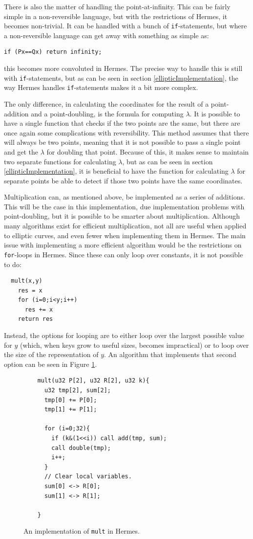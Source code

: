 There is also the matter of handling the point-at-infinity. This can be fairly simple in a non-reversible language, but with the restrictions of Hermes, it becomes non-trivial. It can be handled with a bunch of \texttt{if}-statements, but where a non-reversible language can get away with something as simple as:
\begin{verbatim}
if (Px==Qx) return infinity;
\end{verbatim}
this becomes more convoluted in Hermes. The precise way to handle this is still with \texttt{if}-statements, but as can be seen in section \ref{ellipticImplementation}, the way Hermes handles \texttt{if}-statements makes it a bit more complex. 

The only difference, in calculating the coordinates for the result of a point-addition and a point-doubling, is the formula for computing $\lambda$. It is possible to have a single function that checks if the two points are the same, but there are once again some complications with reversibility. This method assumes that there will always be two points, meaning that it is not possible to pass a single point and get the $\lambda$ for doubling that point. Because of this, it makes sense to maintain two separate functions for calculating $\lambda$, but as can be seen in section \ref{ellipticImplementation}, it is beneficial to have the function for calculating $\lambda$ for separate points be able to detect if those two points have the same coordinates.

Multiplication can, as mentioned above, be implemented as a series of additions. This will be the case in this implementation, due implementation problems with point-doubling, but it is possible to be smarter about multiplication. Although many algorithms exist for efficient multiplication, not all are useful when applied to elliptic curves, and even fewer when implementing them in Hermes. The main issue with implementing a more efficient algorithm would be the restrictions on \texttt{for}-loops in Hermes. Since these can only loop over constants, it is not possible to do:
\begin{verbatim}
  mult(x,y)
    res = x
    for (i=0;i<y;i++)
      res += x
    return res
\end{verbatim}
Instead, the options for looping are to either loop over the largest possible value for $y$ (which, when keys grow to useful sizes, becomes impractical) or to loop over the size of the representation of $y$. An algorithm that implements that second option can be seen in Figure \ref{mult}.
\begin{figure} 
\begin{verbatim}
    mult(u32 P[2], u32 R[2], u32 k){
      u32 tmp[2], sum[2];
      tmp[0] += P[0];
      tmp[1] += P[1];
    
      for (i=0;32){
        if (k&(1<<i)) call add(tmp, sum);
        call double(tmp);
        i++;
      }
      // Clear local variables. 
      sum[0] <-> R[0];
      sum[1] <-> R[1];
      
    }
\end{verbatim}
  \caption{An implementation of \texttt{mult} in Hermes.}
  \label{mult}
\end{figure}

